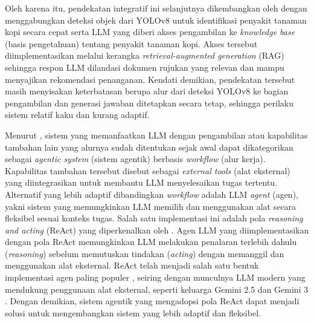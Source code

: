 Oleh karena itu, pendekatan integratif ini selanjutnya dikembangkan oleh \textcite{mondalVisionMeetsLanguage2025} dengan menggabungkan deteksi objek dari YOLOv8 untuk identifikasi penyakit tanaman kopi secara cepat serta LLM yang diberi akses pengambilan ke \textit{knowledge base} (basis pengetahuan) tentang penyakit tanaman kopi. Akses tersebut diimplementasikan melalui kerangka \textit{retrieval-augmented generation} (RAG) sehingga respon LLM dilandasi dokumen rujukan yang relevan dan mampu menyajikan rekomendasi penanganan. Kendati demikian, pendekatan tersebut masih menyisakan keterbatasan berupa alur dari deteksi YOLOv8 ke bagian pengambilan dan generasi jawaban ditetapkan secara tetap, sehingga perilaku sistem relatif kaku dan kurang adaptif.

Menurut \textcite{anthropicBuildingEffectiveAgents2024}, sistem yang memanfaatkan LLM dengan pengambilan atau kapabilitas tambahan lain yang alurnya sudah ditentukan sejak awal dapat dikategorikan sebagai \textit{agentic system} (sistem agentik) berbasis \textit{workflow} (alur kerja). Kapabilitas tambahan tersebut disebut sebagai \textit{external tools} (alat eksternal) yang diintegrasikan untuk membantu LLM menyelesaikan tugas tertentu. Alternatif yang lebih adaptif dibandingkan \textit{workflow} adalah LLM \textit{agent} (agen), yakni sistem yang memungkinkan LLM memilih dan menggunakan alat secara fleksibel sesuai konteks tugas. Salah satu implementasi ini adalah pola \textit{reasoning and acting} (ReAct) yang diperkenalkan oleh \textcite{yaoReActSynergizingReasoning2023}. Agen LLM yang diimplementasikan dengan pola ReAct memungkinkan LLM melakukan penalaran terlebih dahulu (\textit{reasoning}) sebelum memutuskan tindakan (\textit{acting}) dengan memanggil dan menggunakan alat eksternal. ReAct telah menjadi salah satu bentuk implementasi agen paling populer \parencite{yuSurveyAgentWorkflow2025}, seiring dengan munculnya LLM modern yang mendukung penggunaan alat eksternal, seperti keluarga Gemini 2.5 \parencite{comaniciGemini25Pushing2025} dan Gemini 3 \parencite{google2025}. Dengan demikian, sistem agentik yang mengadopsi pola ReAct dapat menjadi solusi untuk mengembangkan sistem yang lebih adaptif dan fleksibel.


